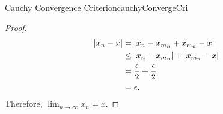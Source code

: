 \documentclass[math]{amznotes}
\theoremstyle{remark}
\begin{document}
\begin{thmbox}{Cauchy Convergence Criterion}{cauchyConvergeCri}
\begin{proof}
        \begin{align*}
            {\left\lvert {x_n - x} \right\rvert} & = {\left\lvert {x_n - x_{m_n} + x_{m_n} - x} \right\rvert} \\
            & \leq {\left\lvert {x_n - x_{m_n}} \right\rvert} + {\left\lvert {x_{m_n} - x} \right\rvert} \\
            & = \frac{\epsilon}{2} + \frac{\epsilon}{2} \\
            & = \epsilon.
        \end{align*}
        Therefore, $\lim_{n \to \infty}x_n = x$.
    \end{proof}
    
\end{thmbox}
\end{document}
